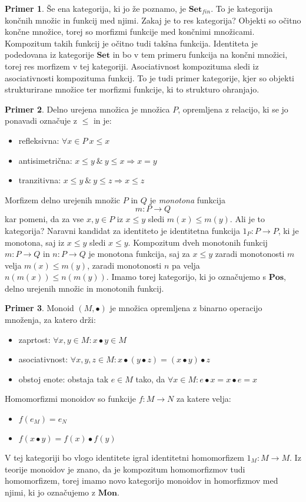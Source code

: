 \documentclass[12pt,a4paper]{book}
\theoremstyle{definition}
\theoremstyle{plain}
\theoremstyle{definition}
\newtheorem{primer}{Primer}[section]
\theoremstyle{remark}
\newcommand{\cat}[1]{\textbf{#1}}
\begin{document}
\begin{primer}
Še ena kategorija, ki jo že poznamo, je $\cat{Set}_{fin}$. To je kategorija končnih množic in funkcij med njimi. Zakaj je to res kategorija? Objekti so očitno končne množice, torej so morfizmi funkcije med končnimi množicami. Kompozitum takih funkcij je očitno tudi takšna funkcija. Identiteta je podedovana iz kategorije $\cat{Set}$ in bo v tem primeru funkcija na končni množici, torej res morfizem v tej kategoriji. Asociativnost kompozituma sledi iz asociativnosti kompozituma funkcij. To je tudi primer kategorije, kjer so objekti strukturirane množice ter morfizmi funkcije, ki to strukturo ohranjajo.
\end{primer}

\begin{primer}
Delno urejena množica je množica $P$, opremljena z relacijo, ki se jo ponavadi označuje z $\leq$ in je:
\begin{itemize}
\item refleksivna: $\forall x \in P \ x \leq x$
\item antisimetrična: $x \leq y \ \& \ y \leq x \Rightarrow x = y$
\item tranzitivna: $x \leq y \ \& \ y \leq z \Rightarrow x \leq z$
\end{itemize}
Morfizem delno urejenih množic $P$ in $Q$ je \emph{monotona} funkcija
$$m : P \to Q$$
kar pomeni, da za vse $x,y \in P$ iz $x \leq y$ sledi $m(x) \leq m(y)$. Ali je to kategorija? Naravni kandidat za identiteto je identitetna funkcija $1_P : P \to P$, ki je monotona, saj iz $x \leq y$ sledi $x \leq y$.
Kompozitum dveh monotonih funkcij $m : P \to Q$ in $n : P \to Q$ je monotona funkcija, saj za $x \leq y$ zaradi monotonosti $m$ velja $m(x) \leq m(y)$, zaradi monotonosti $n$ pa velja $n(m(x)) \leq n(m(y))$. Imamo torej kategorijo, ki jo označujemo s $\cat{Pos}$, delno urejenih množic in monotonih funkcij.
\end{primer}

\begin{primer}
Monoid $(M, \bullet)$ je množica opremljena z binarno operacijo množenja, za katero drži:
\begin{itemize}
\item zaprtost: $\forall x,y \in M : x \bullet y \in M$
\item asociativnost: $\forall x,y,z \in M : x \bullet ( y \bullet z ) = ( x \bullet y ) \bullet z$
\item obstoj enote: obstaja tak $e \in M$ tako, da $\forall x \in M : e \bullet x = x \bullet e = x$
\end{itemize}
Homomorfizmi monoidov so funkcije $f : M \to N$ za katere velja:
\begin{itemize}
\item $f(e_M) = e_N$
\item $f(x \bullet y) = f(x) \bullet f(y)$
\end{itemize}
V tej kategoriji bo vlogo identitete igral identitetni homomorfizem $1_M : M \to M$. Iz teorije monoidov je znano, da je kompozitum homomorfizmov tudi homomorfizem, torej imamo novo kategorijo monoidov in homorfizmov med njimi, ki jo označujemo z $\cat{Mon}$.
\end{primer}
\end{document}
